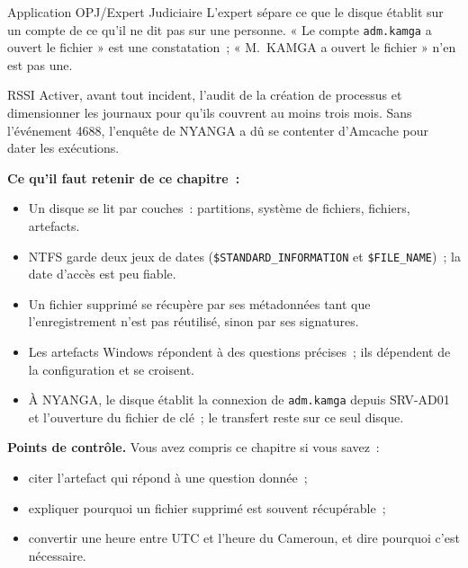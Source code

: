 \begin{boxmetier}{Application OPJ/Expert Judiciaire}
L'expert sépare ce que le disque établit sur un compte de ce qu'il ne dit
pas sur une personne. « Le compte \texttt{adm.kamga} a ouvert le fichier » est
une constatation~; « M.~KAMGA a ouvert le fichier » n'en est pas une.
\end{boxmetier}

\begin{boxmetier}{RSSI}
Activer, avant tout incident, l'audit de la création de processus et
dimensionner les journaux pour qu'ils couvrent au moins trois mois.
Sans l'événement 4688, l'enquête de NYANGA a dû se contenter d'Amcache pour
dater les exécutions.
\end{boxmetier}

\separateur

\begin{boxresume}
\textbf{Ce qu'il faut retenir de ce chapitre~:}
\begin{itemize}
    \item Un disque se lit par couches~: partitions, système de fichiers,
          fichiers, artefacts.
    \item NTFS garde deux jeux de dates (\texttt{\$STANDARD\_INFORMATION} et
          \texttt{\$FILE\_NAME})~; la date d'accès est peu fiable.
    \item Un fichier supprimé se récupère par ses métadonnées tant que
          l'enregistrement n'est pas réutilisé, sinon par ses signatures.
    \item Les artefacts Windows répondent à des questions précises~;
          ils dépendent de la configuration et se croisent.
    \item À NYANGA, le disque établit la connexion de \texttt{adm.kamga}
          depuis SRV-AD01 et l'ouverture du fichier de clé~; le transfert
          reste \NEK{} sur ce seul disque.
\end{itemize}
\end{boxresume}

\begin{boxinfo}
\textbf{Points de contrôle.} Vous avez compris ce chapitre si vous savez~:
\begin{itemize}
    \item citer l'artefact qui répond à une question donnée~;
    \item expliquer pourquoi un fichier supprimé est souvent récupérable~;
    \item convertir une heure entre UTC et l'heure du Cameroun, et dire
          pourquoi c'est nécessaire.
\end{itemize}
\end{boxinfo}

